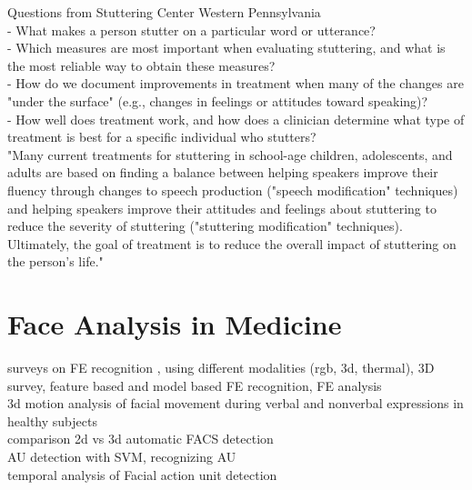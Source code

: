 Questions from Stuttering Center Western Pennsylvania\\
- What makes a person stutter on a particular word or utterance?\\
- Which measures are most important when evaluating stuttering, and what is the most reliable way to obtain these measures?\\
- How do we document improvements in treatment when many of the changes are "under the surface" (e.g., changes in feelings or attitudes toward speaking)?\\
- How well does treatment work, and how does a clinician determine what type of treatment is best for a specific individual who stutters?\\
"Many current treatments for stuttering in school-age children, adolescents, and adults are based on finding a balance between helping speakers improve their fluency through changes to speech production ("speech modification" techniques) and helping speakers improve their attitudes and feelings about stuttering to reduce the severity of stuttering ("stuttering modification" techniques). Ultimately, the goal of treatment is to reduce the overall impact of stuttering on the person's life."\\






\section{Face Analysis in Medicine}

surveys on FE recognition \cite{Anil2016}\cite{Pantic2000}\cite{Sariyanidi2015}, using different modalities (rgb, 3d, thermal)\cite{Corneanu2016survey}, 3D \cite{Danelakis2015}survey\cite{Sandbach2012survey}, feature based and model based FE recognition\cite{Mishra2015}, FE analysis \cite{Tian2005}\\

3d motion analysis of facial movement during verbal and nonverbal expressions in healthy subjects \cite{Sidequersky2016}\\

comparison 2d vs 3d automatic FACS detection \cite{Savran2012}\\

AU detection with SVM\cite{Simon2010}, recognizing AU \cite{Tian2001}\\

temporal analysis of Facial action unit detection \cite{Valstar2006}\\

